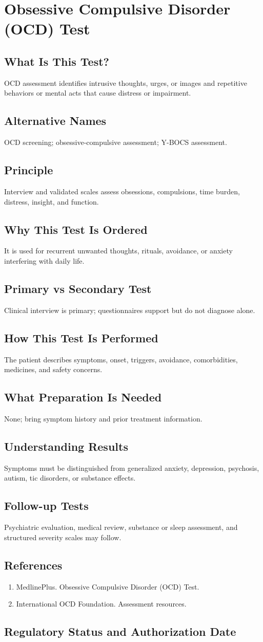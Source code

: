 \chapter{Obsessive Compulsive Disorder (OCD) Test}
\section*{What Is This Test?} OCD assessment identifies intrusive thoughts, urges, or images and repetitive behaviors or mental acts that cause distress or impairment.\section*{Alternative Names} OCD screening; obsessive-compulsive assessment; Y-BOCS assessment.\section*{Principle} Interview and validated scales assess obsessions, compulsions, time burden, distress, insight, and function.\section*{Why This Test Is Ordered} It is used for recurrent unwanted thoughts, rituals, avoidance, or anxiety interfering with daily life.\section*{Primary vs Secondary Test} Clinical interview is primary; questionnaires support but do not diagnose alone.\section*{How This Test Is Performed} The patient describes symptoms, onset, triggers, avoidance, comorbidities, medicines, and safety concerns.\section*{What Preparation Is Needed} None; bring symptom history and prior treatment information.\section*{Understanding Results} Symptoms must be distinguished from generalized anxiety, depression, psychosis, autism, tic disorders, or substance effects.\section*{Follow-up Tests} Psychiatric evaluation, medical review, substance or sleep assessment, and structured severity scales may follow.\section*{References} \begin{enumerate}\item MedlinePlus. Obsessive Compulsive Disorder (OCD) Test.\item International OCD Foundation. Assessment resources.\end{enumerate}\clearpage\section*{Regulatory Status and Authorization Date}\clearpage
